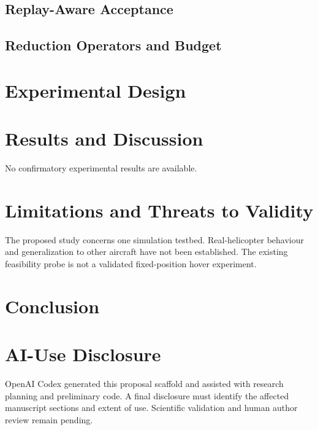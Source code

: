 \documentclass[letterpaper,10pt,conference]{ieeeconf}
\begin{document}
\subsection{Replay-Aware Acceptance}
\subsection{Reduction Operators and Budget}

\section{Experimental Design}

\section{Results and Discussion}
No confirmatory experimental results are available.

\section{Limitations and Threats to Validity}
The proposed study concerns one simulation testbed. Real-helicopter behaviour and generalization to other aircraft have not been established. The existing feasibility probe is not a validated fixed-position hover experiment.

\section{Conclusion}

\section*{AI-Use Disclosure}
OpenAI Codex generated this proposal scaffold and assisted with research planning and preliminary code. A final disclosure must identify the affected manuscript sections and extent of use. Scientific validation and human author review remain pending.



\end{document}
